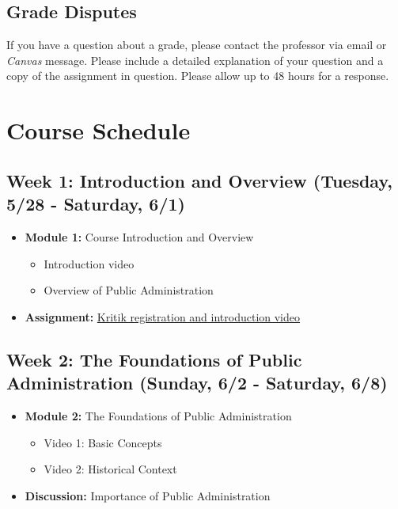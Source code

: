 \documentclass[11pt, letterpaper]{article}
\begin{document}
\subsection*{Grade Disputes}

If you have a question about a grade, please contact the professor via email or \emph{Canvas} message. Please include a detailed explanation of your question and a copy of the assignment in question. Please allow up to 48 hours for a response. 


\section{Course Schedule}

\subsection*{Week 1: Introduction and Overview (Tuesday, 5/28 - Saturday, 6/1)}
\begin{itemize}
    \item \textbf{Module 1:} Course Introduction and Overview
    \begin{itemize}
        \item Introduction video
        \item Overview of Public Administration
    \end{itemize}
    \item \textbf{Assignment:} \href{https://us.kritik.io/course/cltwics8d035m146piz0jn5t0/assignment/cltwics8j035p146pdgj8gj1t?resultsPerPage=50&page=1&filterBy=SHOW_ALL&searchString=&sortBy=NAME&sortOrder=1&viewType=Progress}{Kritik registration and introduction video}
\end{itemize}

\subsection*{Week 2: The Foundations of Public Administration (Sunday, 6/2 - Saturday, 6/8)}
\begin{itemize}
    \item \textbf{Module 2:} The Foundations of Public Administration
    \begin{itemize}
        \item Video 1: Basic Concepts
        \item Video 2: Historical Context
    \end{itemize}
    \item \textbf{Discussion:} Importance of Public Administration


\end{itemize}
\end{document}
